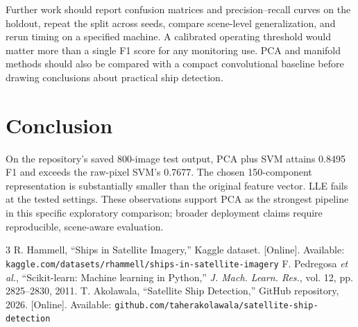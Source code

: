 \documentclass[conference]{IEEEtran}
\begin{document}
Further work should report confusion matrices and precision--recall curves on the holdout, repeat the split across seeds, compare scene-level generalization, and rerun timing on a specified machine. A calibrated operating threshold would matter more than a single F1 score for any monitoring use. PCA and manifold methods should also be compared with a compact convolutional baseline before drawing conclusions about practical ship detection.

\section{Conclusion}
On the repository's saved 800-image test output, PCA plus SVM attains 0.8495 F1 and exceeds the raw-pixel SVM's 0.7677. The chosen 150-component representation is substantially smaller than the original feature vector. LLE fails at the tested settings. These observations support PCA as the strongest pipeline in this specific exploratory comparison; broader deployment claims require reproducible, scene-aware evaluation.

\begin{thebibliography}{3}
 R. Hammell, ``Ships in Satellite Imagery,'' Kaggle dataset. [Online]. Available: \texttt{kaggle.com/datasets/rhammell/ships-in-satellite-imagery}
 F. Pedregosa \emph{et al.}, ``Scikit-learn: Machine learning in Python,'' \emph{J. Mach. Learn. Res.}, vol. 12, pp. 2825--2830, 2011.
 T. Akolawala, ``Satellite Ship Detection,'' GitHub repository, 2026. [Online]. Available: \texttt{github.com/taherakolawala/satellite-ship-detection}
\end{thebibliography}
\end{document}
